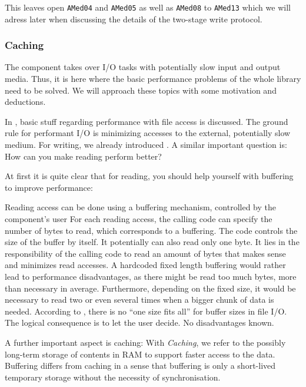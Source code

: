 This leaves open \texttt{AMed04} and \texttt{AMed05} as well as \texttt{AMed08} to \texttt{AMed13} which we will adress later when discussing the details of the two-stage write protocol.


\subsubsection{Caching}
\label{sec:PerfMedia}

The component \COMPmedia{} takes over I/O tasks with potentially slow input and output media. Thus, it is here where the basic performance problems of the whole library need to be solved. We will approach these topics with some motivation and deductions.

In \cite{PWikIO}, basic stuff regarding performance with file access is discussed. The ground rule for performant I/O is minimizing accesses to the external, potentially slow medium. For writing, we already introduced . A similar important question is: How can you make reading perform better?

At first it is quite clear that for reading, you should help yourself with buffering to improve performance:

{%
Reading access can be done using a buffering mechanism, controlled by the component's user
}
{%
For each reading access, the calling code can specify the number of bytes to read, which corresponds to a buffering. The code controls the size of the buffer by itself. It potentially can also read only one byte. It lies in the responsibility of the calling code to read an amount of bytes that makes sense and minimizes read accesses.
}
{%
A hardcoded fixed length buffering would rather lead to performance disadvantages, as there might be read too much bytes, more than necessary in average. Furthermore, depending on the fixed size, it would be necessary to read two or even several times when a bigger chunk of data is needed. According to \cite{PWikIO}, there is no ``one size fits all'' for buffer sizes in file I/O. The logical consequence is to let the user decide.
}
{%
No disadvantages known.
}

A further important aspect is caching: With \emph{Caching}, we refer to the possibly long-term storage of \TERMmedium{} contents in RAM to support faster access to the data. Buffering differs from caching in a sense that buffering is only a short-lived temporary storage without the necessity of synchronisation.

